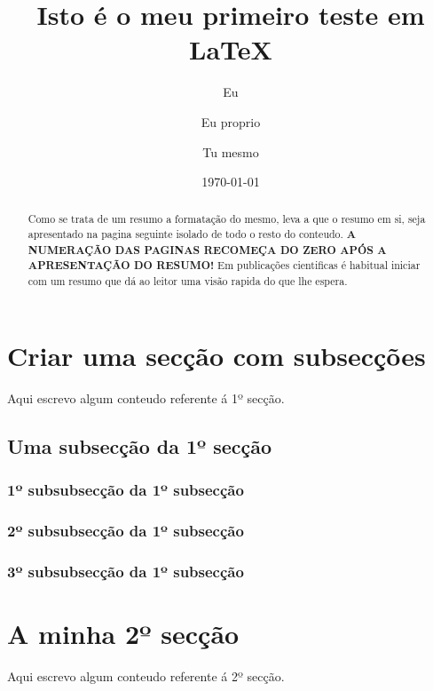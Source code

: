 \documentclass[a4paper,11pt]{article}%
\author {Eu \and Eu proprio \and Tu mesmo}
\title {Isto é o meu primeiro teste em \LaTeX}
\date {\today}%
\begin{document}

\maketitle
\tableofcontents %
\listoffigures
\newpage

\begin{abstract}
	Como se trata de um resumo a formatação do mesmo, leva a que o resumo em si, seja apresentado na pagina seguinte isolado de todo o resto do conteudo. \textbf{ A NUMERAÇÃO DAS PAGINAS RECOMEÇA DO ZERO APÓS A APRESENTAÇÃO DO RESUMO!}
	Em publicações cientificas é habitual iniciar com um resumo que dá ao leitor uma visão rapida do que lhe espera.
\end{abstract}



\newpage

\section{Criar uma secção com subsecções}

Aqui escrevo algum conteudo referente á 1º secção.
\subsection{Uma subsecção da 1º secção}
\subsubsection{1º subsubsecção da 1º subsecção}
\subsubsection{2º subsubsecção da 1º subsecção}
\subsubsection{3º subsubsecção da 1º subsecção}

\section{A minha 2º secção}
Aqui escrevo algum conteudo referente á 2º secção.
\end{document}
